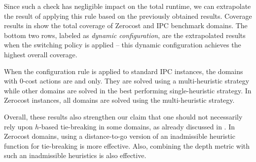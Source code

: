 Since such a check has negligible impact on the total runtime, we can extrapolate the result of applying this rule based on the previously obtained results.
Coverage results in  show the total coverage of
Zerocost and IPC benchmark domains. The bottom two rows, labeled as \emph{dynamic configuration},
are the extrapolated results when the switching policy is applied -- this dynamic configuration achieves the highest overall coverage.

\begin{table}[htbp]
 \centering 
 \caption{
 Summary Results: Coverage comparison, the total of IPC domains and Zerocost domains (the number of instances
 solved in 5min, 4GB) between several sorting strategies, plus a dynamic configuration strategy.  $[f,h,\fifo],
 [f,h,\ro], [f,\hh,\mit{default}], [f,h, \hh,\mit{default}], [f,\ffo,\mit{default}]$ are not shown because they achieve smaller coverage.
 }
 \label{tbl:dtg-summary-sum}
\end{table}

When the configuration rule is applied to standard IPC instances, the domains with 0-cost actions are  and  only. They are solved using a multi-heuristic strategy while other domains are solved in the best performing single-heuristic strategy. In Zerocost instances, all domains are solved using the multi-heuristic strategy.



Overall, these results also strengthen our claim that one should not necessarily rely upon $h$-based
tie-breaking in some
domains, as already discussed in . In Zerocost domains,
using a distance-to-go version of an inadmissible heuristic function for
tie-breaking is more effective. Also, combining the depth metric with
such an inadmissible heuristics is also effective.
